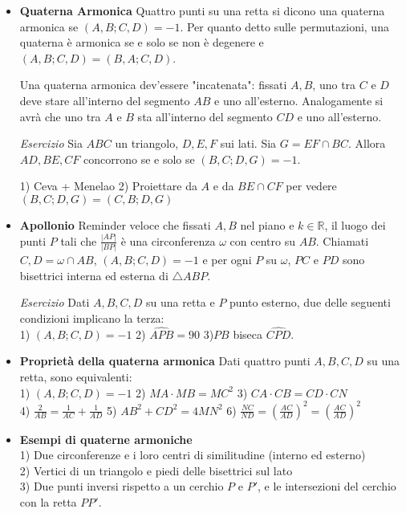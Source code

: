 \begin{itemize}
\item \textbf{Quaterna Armonica} Quattro punti su una retta si dicono una quaterna armonica se $(A,B;C,D)=-1$. Per quanto detto sulle permutazioni, una quaterna è armonica se e solo se non è degenere e $(A,B;C,D)=(B,A;C,D)$.

Una quaterna armonica dev'essere "incatenata": fissati $A,B$, uno tra $C$ e $D$ deve stare all'interno del segmento $AB$ e uno all'esterno. Analogamente si avrà che uno tra $A$ e $B$ sta all'interno del segmento $CD$ e uno all'esterno.

\emph{Esercizio} Sia $ABC$ un triangolo, $D,E,F$ sui lati. Sia $G=EF\cap BC$. Allora $AD,BE,CF$ concorrono se e solo se $(B,C;D,G)=-1$.\\
\begin{sol}
1) Ceva + Menelao 2) Proiettare da $A$ e da $BE\cap CF$ per vedere $(B,C;D,G)=(C,B;D,G)$ 
\end{sol}

\item \textbf{Apollonio} Reminder veloce che fissati $A,B$ nel piano e $k\in \mathbb{R}$, il luogo dei punti $P$ tali che $\frac{|AP|}{|BP|}$ è una circonferenza $\omega$ con centro su $AB$. Chiamati $C,D=\omega \cap AB$, $(A,B;C,D)=-1$ e per ogni $P$ su $\omega$, $PC$ e $PD$ sono bisettrici interna ed esterna di $\triangle ABP$. 

\emph{Esercizio} Dati $A,B,C,D$ su una retta e $P$ punto esterno, due delle seguenti condizioni implicano la terza:\\
1) $(A,B;C,D)=-1$ \hspace{0.2cm} 2) $\widehat{APB}=90$  \hspace{0.3cm} 3)$PB$ biseca $\widehat{CPD}$.

\item \textbf{Proprietà della quaterna armonica} Dati quattro punti $A,B,C,D$ su una retta, sono equivalenti:\\
1) $(A,B;C,D)=-1$ \hspace{0.2cm}2) $MA\cdot MB=MC^2$ \hspace{0.2cm} 3) $CA\cdot CB=CD\cdot CN$  \hspace{0.2cm}\\ 4)  $\displaystyle\frac{2}{AB}=\displaystyle\frac{1}{AC}+\displaystyle\frac{1}{AD}$  \hspace{0.2cm} 5)  $AB^2+CD^2=4MN^2$  \hspace{0.2cm} 6)  $\frac{NC}{ND}=\left(\frac{AC}{AD}\right)^2=\left(\frac{AC}{AD}\right)^2$

\item \textbf{Esempi di quaterne armoniche}\\
1) Due circonferenze e i loro centri di similitudine (interno ed esterno)\\
2) Vertici di un triangolo e piedi delle bisettrici sul lato\\
3) Due punti inversi rispetto a un cerchio $P$ e $P'$, e le intersezioni del cerchio con la retta $PP'$.


\end{itemize}

